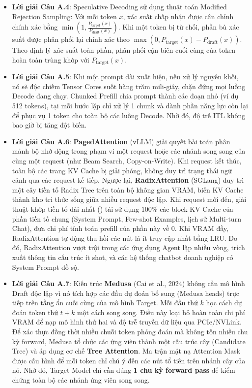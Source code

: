 \begin{itemize}
  \item \textbf{Lời giải Câu A.4}:
  Speculative Decoding sử dụng thuật toán Modified Rejection Sampling: Với mỗi token $x$, xác suất chấp nhận được cân chỉnh chính xác bằng $\min\left(1, \frac{P_{\text{target}}(x)}{P_{\text{draft}}(x)}\right)$. Khi một token bị từ chối, phần bù xác suất được phân phối lại chính xác theo $\max(0, P_{\text{target}}(x) - P_{\text{draft}}(x))$. Theo định lý xác suất toàn phần, phân phối cận biên cuối cùng của token hoàn toàn trùng khớp với $P_{\text{target}}(x)$.

  \item \textbf{Lời giải Câu A.5}:
  Khi một prompt dài xuất hiện, nếu xử lý nguyên khối, nó sẽ độc chiếm Tensor Cores suốt hàng trăm mili-giây, chặn đứng mọi luồng Decode đang chạy. Chunked Prefill chia prompt thành các đoạn nhỏ (ví dụ 512 tokens), tại mỗi bước lặp chỉ xử lý 1 chunk và dành phần năng lực còn lại để phục vụ 1 token cho toàn bộ các luồng Decode. Nhờ đó, độ trễ ITL không bao giờ bị tăng đột biến.

  \item \textbf{Lời giải Câu A.6}:
  \textbf{PagedAttention} (vLLM) giải quyết bài toán phân mảnh bộ nhớ động trong phạm vi một request hoặc các nhánh song song của cùng một request (như Beam Search, Copy-on-Write). Khi request kết thúc, toàn bộ các trang KV Cache bị giải phóng, không duy trì trạng thái ngữ cảnh qua các request kế tiếp.
  Ngược lại, \textbf{RadixAttention} (SGLang) duy trì một cây tiền tố Radix Tree trên toàn bộ không gian VRAM, biến KV Cache thành kho tri thức sống giữa nhiều request độc lập. Khi request mới đến, giải thuật khớp tiền tố dài nhất () tái sử dụng $100\%$ các block KV Cache của phần tiền tố chung (System Prompt, Few-shot Examples, lịch sử Multi-turn Chat), đưa chi phí tính toán prefill của phần này về 0. Khi VRAM đầy, RadixAttention tự động thu hồi các nút lá ít truy cập nhất bằng LRU. Do đó, RadixAttention vượt trội trong các ứng dụng Agent lặp nhiều vòng, trích xuất thông tin cấu trúc ít shot, và các hệ thống chatbot doanh nghiệp có System Prompt đồ sộ.

  \item \textbf{Lời giải Câu A.7}:
  Kiến trúc \textbf{Medusa} (Cai et al., 2024) không cần mô hình Draft độc lập vì nó tích hợp các đầu dự đoán bổ sung (Medusa heads) trực tiếp trên tầng ẩn cuối cùng của mô hình Target. Mỗi đầu thứ $k$ học cách dự đoán token thứ $t+k$ một cách song song. Điều này loại bỏ hoàn toàn chi phí VRAM để nạp mô hình thứ hai và độ trễ truyền dữ liệu qua PCIe/NVLink.
  Để xác thực đồng thời nhiều chuỗi token phỏng đoán mà không tốn nhiều chu kỳ forward, Medusa tổ chức các ứng viên thành một cấu trúc cây (Candidate Tree) và áp dụng cơ chế \textbf{Tree Attention}. Ma trận mặt nạ Attention Mask được cấu hình để mỗi token chỉ chú ý đến các nút tổ tiên trên nhánh cây của nó. Nhờ đó, Target Model chỉ cần đúng \textbf{1 chu kỳ forward pass} để kiểm chứng toàn bộ các nhánh ứng viên song song.
\end{itemize}

